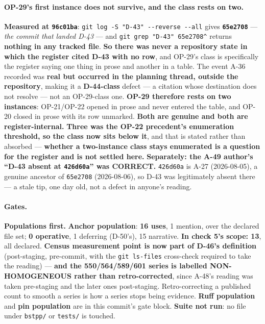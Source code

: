\documentclass[
  10pt,
]{article}
\begin{document}
\paragraph{OP-29's first instance does not survive, and the class rests on two.}
\textbf{Measured at \texttt{96c01ba}}: \texttt{git log -S "D-43" -{}-reverse -{}-all} gives \textbf{\texttt{65e2708}} --- \emph{the commit that landed D-43} --- and \texttt{git grep "D-43" 65e2708\textasciicircum} returns \textbf{nothing in any tracked file}. \textbf{So there was never a repository state in which the register cited D-43 with no row}, and OP-29's class is specifically the register saying one thing in prose and another in a table. The event A-36 recorded was \textbf{real but occurred in the planning thread, outside the repository}, making it a \textbf{D-44-class} defect --- a citation whose destination does not resolve --- not an OP-29-class one. \textbf{OP-29 therefore rests on two instances}: OP-21/OP-22 opened in prose and never entered the table, and OP-20 closed in prose with its row unmarked. \textbf{Both are genuine and both are register-internal.} \textbf{Three was the OP-22 precedent's enumeration threshold, so the class now sits below it}, and that is stated rather than absorbed --- \textbf{whether a two-instance class stays enumerated is a question for the register and is not settled here.} \textbf{Separately: the A-49 author's ``D-43 absent at \texttt{426d60a}'' was CORRECT.} \texttt{426d60a} is A-27 (2026-08-05), a genuine ancestor of \texttt{65e2708} (2026-08-06), so D-43 was legitimately absent there --- a stale tip, one day old, not a defect in anyone's reading.

\paragraph{Gates.}
\textbf{Populations first.} \textbf{Anchor population}: \textbf{16 uses}, 1 mention, over the declared file set; \textbf{0 operative}, 1 deferring (D-50's), 15 narrative. \textbf{In check 5's scope: 13}, all declared. \textbf{Census measurement point is now part of D-46's definition} (post-staging, pre-commit, with the \texttt{git ls-files} cross-check required to take the reading) --- \textbf{and the 550/564/589/601 series is labelled NON-HOMOGENEOUS rather than retro-corrected}, since A-48's reading was taken pre-staging and the later ones post-staging. Retro-correcting a published count to smooth a series is how a series stops being evidence. \textbf{Ruff population} and \textbf{pin population} are in this commit's gate block. \textbf{Suite not run}: no file under \texttt{bstpp/} or \texttt{tests/} is touched.
\end{document}
